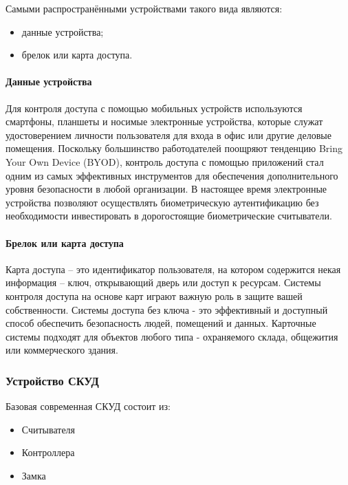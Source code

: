 Самыми распространёнными устройствами такого вида являются:

\begin{itemize}
	\item данные устройства;
	\item брелок или карта доступа.
\end{itemize}

\paragraph{Данные устройства}

Для контроля доступа с помощью мобильных устройств используются смартфоны, планшеты и носимые электронные устройства, которые служат удостоверением личности пользователя для входа в офис или другие деловые помещения. Поскольку большинство работодателей поощряют тенденцию Bring Your Own Device (BYOD), контроль доступа с помощью приложений стал одним из самых эффективных инструментов для обеспечения дополнительного уровня безопасности в любой организации. В настоящее время электронные устройства позволяют осуществлять биометрическую аутентификацию без необходимости инвестировать в дорогостоящие биометрические считыватели.

\paragraph{Брелок или карта доступа}

Карта доступа – это идентификатор пользователя, на котором содержится некая информация – ключ, открывающий дверь или доступ к ресурсам. 
Системы контроля доступа на основе карт играют важную роль в защите вашей собственности. Системы доступа без ключа - это эффективный и доступный способ обеспечить безопасность людей, помещений и данных. Карточные системы подходят для объектов любого типа - охраняемого склада, общежития или коммерческого здания.

\subsubsection{Устройство СКУД}

Базовая современная СКУД состоит из:

\begin{itemize}
	\item Считывателя
	\item Контроллера
	\item Замка
\end{itemize}

